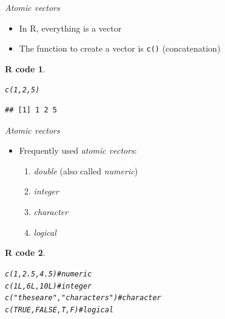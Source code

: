 \documentclass[11pt]{beamer}\usepackage[]{graphicx}\usepackage[]{color}
\makeatletter
\newcommand{\hlnum}[1]{\textcolor[rgb]{0.063,0.58,0.627}{#1}}%
\newcommand{\hlstr}[1]{\textcolor[rgb]{0.063,0.58,0.627}{#1}}%
\newcommand{\hlcom}[1]{\textcolor[rgb]{0.588,0.588,0.588}{#1}}%
\newcommand{\hlstd}[1]{\textcolor[rgb]{0.196,0.196,0.196}{#1}}%
\newcommand{\hlkwd}[1]{\textcolor[rgb]{0.78,0.227,0.412}{#1}}%
\newenvironment{kframe}{%
 \def\at@end@of@kframe{}%
 \ifinner\ifhmode%
  \def\at@end@of@kframe{\end{minipage}}%
  \begin{minipage}{\columnwidth}%
 \fi\fi%
 \def\FrameCommand##1{\hskip\@totalleftmargin \hskip-\fboxsep
 \colorbox{shadecolor}{##1}\hskip-\fboxsep
     \hskip-\linewidth \hskip-\@totalleftmargin \hskip\columnwidth}%
 \MakeFramed {\advance\hsize-\width
   \@totalleftmargin\z@ \linewidth\hsize
   \@setminipage}}%
 {\par\unskip\endMakeFramed%
 \at@end@of@kframe}
\newenvironment{knitrout}{}{} %
\newtheorem{rcode}{R code}[section]
\newcommand{\code}[1]{\texttt{#1}}
\makeatother
\begin{document}
\begin{frame}[fragile]{\textit{Atomic vectors}}

\begin{itemize}
  \setlength\itemsep{2em}
\item In R, everything is a vector
\pause \item The function to create a vector is \code{c()} (concatenation)
\end{itemize}
\pause
\begin{knitrout}
\color{fgcolor}\begin{kframe}
\begin{rcode}\label{unnamed-chunk-12}\begin{alltt}
\hlkwd{c}\hlstd{(}\hlnum{1}\hlstd{,} \hlnum{2}\hlstd{,} \hlnum{5}\hlstd{)}
\end{alltt}
\begin{verbatim}
## [1] 1 2 5
\end{verbatim}
\end{rcode}\end{kframe}
\end{knitrout}

\end{frame}




\begin{frame}[fragile]{\textit{Atomic vectors}}

\begin{itemize}
  \setlength\itemsep{2em}
\item Frequently used \textit{atomic vectors}: 
\begin{enumerate}
\item \textit{double} (also called \textit{numeric})
\item \textit{integer}
\item \textit{character}
\item \textit{logical}
\end{enumerate}
\end{itemize}
\pause
\begin{knitrout}
\color{fgcolor}\begin{kframe}
\begin{rcode}\label{unnamed-chunk-13}\begin{alltt}
\hlkwd{c}\hlstd{(}\hlnum{1}\hlstd{,} \hlnum{2.5}\hlstd{,} \hlnum{4.5}\hlstd{)} \hlcom{# numeric}
\hlkwd{c}\hlstd{(}\hlnum{1L}\hlstd{,} \hlnum{6L}\hlstd{,} \hlnum{10L}\hlstd{)} \hlcom{# integer}
\hlkwd{c}\hlstd{(}\hlstr{"these are"}\hlstd{,} \hlstr{"characters"}\hlstd{)} \hlcom{#character}
\hlkwd{c}\hlstd{(}\hlnum{TRUE}\hlstd{,} \hlnum{FALSE}\hlstd{, T, F)} \hlcom{# logical}
\end{alltt}
\end{rcode}\end{kframe}
\end{knitrout}

\end{frame}
\end{document}
